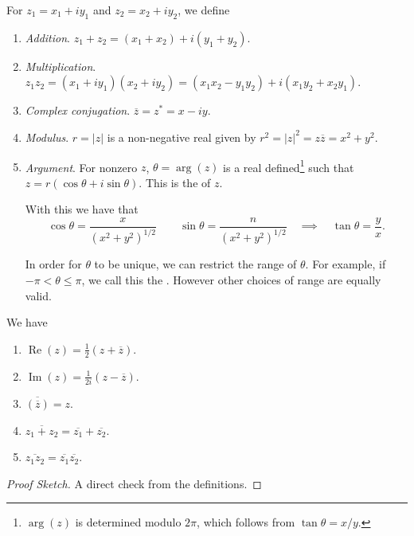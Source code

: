 \documentclass[a4]{scrreprt}
\begin{document}
\begin{definition}\label{def:complex-arithmetic}
	For $z_1 = x_1 + i y_1$ and $z_2 = x_2 + i y_2$, we define
\begin{enumerate}[label=(\roman*)]
	\item \emph{Addition}. $z_1 + z_2 = (x_1 + x_2) + i(y_1 + y_2)$.
	\item \emph{Multiplication}. $z_1 z_2 = (x_1 + i y_1)(x_2 + i y_2) = (x_1 x_2 - y_1 y_2) + i(x_1 y_2 + x_2 y_1)$.
	\item \emph{Complex conjugation}. $\overline{z} = z^* = x - iy$.
	\item \emph{Modulus}. $r = |z|$ is a non-negative real given by $r^2 = |z|^2 = z \overline{z} = x^2 + y^2$.
	\item \emph{Argument}. For nonzero $z$, $\theta = \operatorname{arg}(z)$ is a real defined\footnote{$\operatorname{arg}(z)$ is determined modulo $2\pi$, which follows from $\tan \theta = x/y$.} such that $z = r(\cos \theta + i \sin \theta)$. This is the  of $z$.
	
	With this we have that
	$$
	\cos \theta=\frac{x}{\left(x^{2}+y^{2}\right)^{1 / 2}} \quad \quad \sin \theta=\frac{n}{\left(x^{2}+y^{2}\right)^{1 / 2}} \quad \implies  \quad \tan \theta=\frac{y}{x}.
	$$

	In order for $\theta$ to be unique, we can restrict the range of $\theta$. For example, if $-\pi < \theta \leq \pi$, we call this the . However other choices of range are equally valid.
\end{enumerate}
\end{definition}

\begin{proposition}
	We have
	\begin{enumerate}[label=(\roman*)]
		\item $\operatorname{Re}(z) = \frac{1}{2}(z + \overline{z})$.
		\item $\operatorname{Im}(z) = \frac{1}{2i}(z - \overline{z})$.
		\item $\overline{(\overline{z})} = z$.
		\item $\overline{z_1 + z_2} = \overline{z_1} + \overline{z_2}$.
		\item $\overline{z_1 z_2} = \overline{z_1} \overline{z_2}$.
	\end{enumerate}
\end{proposition}
\begin{proof}[Proof Sketch]
	A direct check from the definitions.
\end{proof}
\end{document}
